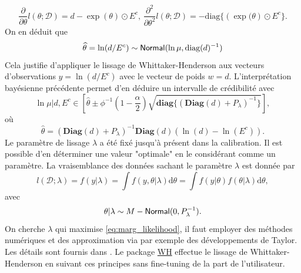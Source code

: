 $$
\frac{\partial}{\partial\theta}l(\theta;\mathcal{D}) = d-\exp(\theta)\odot E^c\text{, }\frac{\partial^2}{\partial\theta^2}l(\theta;\mathcal{D})  = -\text{diag}\{\left(\exp(\theta\right)\odot E^c\}.
$$
On en déduit que 
$$
\widehat{\theta} = \ln(d/E^c) \sim\mathsf{Normal}(\ln\mu,\text{diag}(d)^{-1})
$$
Cela justifie d'appliquer le lissage de Whittaker-Henderson aux vecteurs d'observations $y=\ln(d/E^c)$ avec le vecteur de poids $w= d$. L'interprétation bayésienne précédente permet d'en déduire un intervalle de crédibilité avec 
$$
\ln\mu|d,E^c\in\left[\widehat{\theta}\pm\phi^{-1}\left(1-\frac{\alpha}{2}\right)\sqrt{\textbf{diag}\{(\textbf{Diag}(d)+P_\lambda)^{-1}\}}\right],
$$
où 
$$
\widehat{\theta} = (\textbf{Diag}(d)+P_\lambda)^{-1}\textbf{Diag}(d)(\ln(d)-\ln(E^c)).
$$
Le paramètre de lissage $\lambda$ a été fixé jusqu'à présent dans la calibration. Il est possible d'en déterminer une valeur "optimale" en le considérant comme un paramètre. La vraisemblance des données sachant le paramètre $\lambda$ est donnée par 
\begin{equation}\label{eq:marg_likelihood}
l(\mathcal{D}; \lambda) = f(y|\lambda) = \int f(y, \theta|\lambda)\text{d}\theta = \int f(y |\theta)f(\theta|\lambda)\text{d}\theta,
\end{equation}
avec 
$$
\theta|\lambda\sim M-\mathsf{Normal}(0, P_{\lambda}^{-1}).
$$
On cherche $\lambda$ qui maximise \eqref{eq:marg_likelihood}, il faut employer des méthodes numériques et des approximation via par exemple des développements de Taylor. Les détails sont fournis dans \citet{Biessy2023}. Le package \href{https://cran.r-project.org/web/packages/WH/index.html}{WH} effectue le lissage de Whittaker-Henderson en suivant ces principes sans fine-tuning de la part de l'utilisateur.